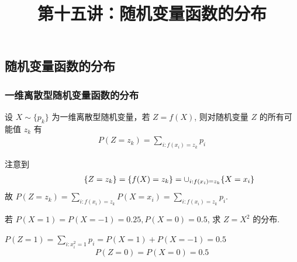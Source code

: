 \documentclass[Prob-All.tex]{subfiles}
\begin{document}
 \title[概率论]{第十五讲：随机变量函数的分布}
 \date{}



 	{ 
 		\begin{frame}
 			\titlepage
 		\end{frame}
 	}















 \subsection{随机变量函数的分布}
 \begin{frame}
 	\frametitle{一维离散型随机变量函数的分布}
 	\begin{thm}
 		设 $X\sim \{p_k\}$ 为一维离散型随机变量，若 $Z=f (X)$, 则对随机变量 $Z$ 的所有可能值 $z_k$ 有
 		\begin{eqnarray*}
 			P(Z=z_k)=\sum_{i:f(x_i)=z_k}p_i
 		\end{eqnarray*}
 	\end{thm}%
 	\pause%
 	\noindent\zheng 注意到 \vspace{-1cm}
 	\begin{eqnarray*}
 		\hspace{1.5cm} \{Z=z_k\}=\{f(X)=z_k\}=\cup_{i:f(x_i)=z_k}\{X=x_i\}
 	\end{eqnarray*}
 	\pause 故 $P (Z=z_k)=\sum_{i:f (x_i)=z_k} P (X=x_i)=\sum_{i:f (x_i)=z_k} p_i$.
 	\begin{exam}
 		若 $P (X=1)=P (X=-1)=0.25, P (X=0)=0.5$, 求 $Z=X^2$ 的分布.
 	\end{exam}

 	\jieda \pause$P(Z=1)=\sum_{i:x_i^2=1}p_i=P(X=1)+P(X=-1)=0.5$\\
 	\pause $$P(Z=0)=P(X=0)=0.5$$
 \end{frame}
\end{document}
